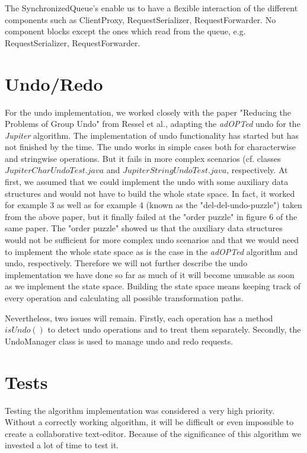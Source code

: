 The SynchronizedQueue's enable us to have a flexible interaction of the different components such as ClientProxy, RequestSerializer, RequestForwarder. No component blocks except the ones which read from the queue, e.g. RequestSerializer, RequestForwarder.

\section{Undo/Redo}
\label{undo_redo}
For the undo implementation, we worked closely with the paper "Reducing the Problems of Group Undo" from Ressel et al., adapting the \emph{adOPTed} undo for the \emph{Jupiter} algorithm. 
The implementation of undo functionality has started but has not finished by the time. The undo works in simple cases both for characterwise and stringwise operations. But it fails in more complex scenarios (cf. classes $JupiterCharUndoTest.java$ and $JupiterStringUndoTest.java$, respectively. At first, we assumed that we could implement the undo with some auxiliary data structures and would not have to build the whole state space. In fact, it worked for example 3 as well as for example 4 (known as the "del-del-undo-puzzle") taken from the above paper, but it finally failed at the "order puzzle" in figure 6 of the same paper. The "order puzzle" showed us that the auxiliary data structures would not be sufficient for more complex undo scenarios and that we would need to implement the whole state space as is the case in the \emph{adOPTed} algorithm and undo, respectively. 
Therefore we will not further describe the undo implementation we have done so far as much of it will become unusable as soon as we implement the state space. Building the state space means keeping track of every operation and calculating all possible transformation paths.

Nevertheless, two issues will remain. Firstly, each operation has a method $isUndo()$ to detect undo operations and to treat them separately. Secondly, the UndoManager class is used to manage undo and redo requests.

\section{Tests}
Testing the algorithm implementation was considered a very high priority. Without a correctly working algorithm, it will be difficult or even impossible to create a collaborative text-editor. Because of the significance of this algorithm we invested a lot of time to test it.

